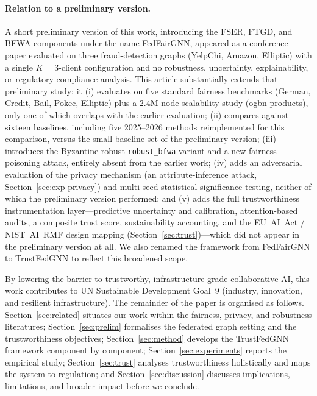 \documentclass[pdflatex,sn-mathphys-num]{sn-jnl}
\theoremstyle{thmstyleone}%
\theoremstyle{thmstyletwo}%
\theoremstyle{thmstylethree}%
\begin{document}
\paragraph{Relation to a preliminary version.}
A short preliminary version of this work, introducing the FSER, FTGD, and BFWA
components under the name FedFairGNN, appeared as a conference paper
\cite{dang2026fedfairgnn} evaluated on three fraud-detection graphs
(YelpChi, Amazon, Elliptic) with a single $K{=}3$-client configuration and no
robustness, uncertainty, explainability, or regulatory-compliance analysis. This
article substantially extends that preliminary study: it (i) evaluates on five
standard fairness benchmarks (German, Credit, Bail, Pokec, Elliptic) plus a
$2.4$M-node scalability study (ogbn-products), only one of which overlaps with
the earlier evaluation; (ii) compares against sixteen baselines, including five
2025--2026 methods reimplemented for this comparison, versus the small baseline
set of the preliminary version; (iii) introduces the Byzantine-robust
\texttt{robust\_bfwa} variant and a new fairness-poisoning attack, entirely
absent from the earlier work; (iv) adds an adversarial evaluation of the privacy
mechanism (an attribute-inference attack, Section~\ref{sec:exp-privacy}) and
multi-seed statistical significance testing, neither of which the preliminary
version performed; and (v) adds the full trustworthiness instrumentation
layer---predictive uncertainty and calibration, attention-based audits, a
composite trust score, sustainability accounting, and the EU~AI~Act / NIST~AI~RMF
design mapping (Section~\ref{sec:trust})---which did not appear in the
preliminary version at all. We also renamed the framework from FedFairGNN to
TrustFedGNN to reflect this broadened scope.

By lowering the barrier to trustworthy, infrastructure-grade collaborative AI,
this work contributes to UN Sustainable Development Goal~9 (industry,
innovation, and resilient infrastructure). The remainder of the paper is
organised as follows. Section~\ref{sec:related} situates our work within the
fairness, privacy, and robustness literatures; Section~\ref{sec:prelim}
formalises the federated graph setting and the trustworthiness objectives;
Section~\ref{sec:method} develops the TrustFedGNN framework component by
component; Section~\ref{sec:experiments} reports the empirical study;
Section~\ref{sec:trust} analyses trustworthiness holistically and maps the
system to regulation; and Section~\ref{sec:discussion} discusses implications,
limitations, and broader impact before we conclude.
\end{document}
